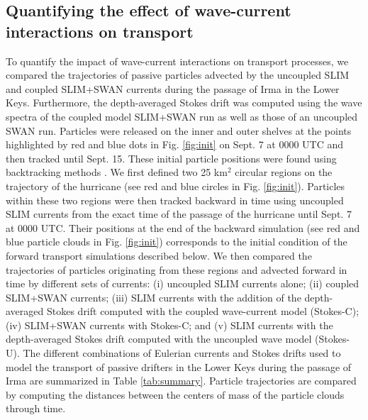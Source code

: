 \subsection{Quantifying the effect of wave-current interactions on transport}\label{sec:traj}

To quantify the impact of wave-current interactions on transport processes, we compared the trajectories of passive particles advected by the uncoupled SLIM and coupled SLIM+SWAN currents during the passage of Irma in the Lower Keys. Furthermore, the depth-averaged Stokes drift was computed using the wave spectra of the coupled model SLIM+SWAN run as well as those of an uncoupled SWAN run. Particles were released on the inner and outer shelves at the points highlighted by red and blue dots in Fig. \ref{fig:init} on Sept. 7 at 0000 UTC and then tracked until Sept. 15. These initial particle positions were found using backtracking methods \citep{spivakovskaya2005simulation} . We first defined two 25 km$^\text{2}$ circular regions on the trajectory of the hurricane (see red and blue circles in Fig. \ref{fig:init}). Particles within these two regions were then tracked backward in time using uncoupled SLIM currents from the exact time of the passage of the hurricane until Sept. 7 at 0000 UTC. Their positions at the end of the backward simulation (see red and blue particle clouds in Fig. \ref{fig:init}) corresponds to the initial condition of the forward transport simulations described below. We then compared the trajectories of particles originating from these regions and advected forward in time by different sets of currents: (i) uncoupled SLIM currents alone; (ii) coupled SLIM+SWAN currents; (iii) SLIM currents with the addition of the depth-averaged Stokes drift computed with the coupled wave-current model (Stokes-C); (iv) SLIM+SWAN currents with Stokes-C; and (v) SLIM currents with the depth-averaged Stokes drift computed with the uncoupled wave model (Stokes-U). The different combinations of Eulerian currents and Stokes drifts used to model the transport of passive drifters in the Lower Keys during the passage of Irma are summarized in Table \ref{tab:summary}. Particle trajectories are compared by computing the distances between the centers of mass of the particle clouds through time.

